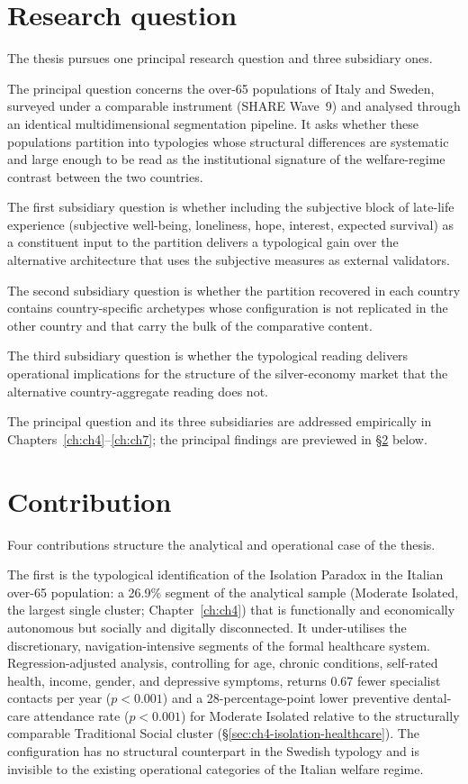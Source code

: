 \section{Research question}
\label{sec:ch1-question}

The thesis pursues one principal research question and three subsidiary ones.

The principal question concerns the over-65 populations of Italy and Sweden, surveyed under a comparable instrument (SHARE Wave~9) and analysed through an identical multidimensional segmentation pipeline. It asks whether these populations partition into typologies whose structural differences are systematic and large enough to be read as the institutional signature of the welfare-regime contrast between the two countries.

The first subsidiary question is whether including the subjective block of late-life experience (subjective well-being, loneliness, hope, interest, expected survival) as a constituent input to the partition delivers a typological gain over the alternative architecture that uses the subjective measures as external validators.

The second subsidiary question is whether the partition recovered in each country contains country-specific archetypes whose configuration is not replicated in the other country and that carry the bulk of the comparative content.

The third subsidiary question is whether the typological reading delivers operational implications for the structure of the silver-economy market that the alternative country-aggregate reading does not.

The principal question and its three subsidiaries are addressed empirically in Chapters~\ref{ch:ch4}--\ref{ch:ch7}; the principal findings are previewed in \S\ref{sec:ch1-contribution} below.

\section{Contribution}
\label{sec:ch1-contribution}

Four contributions structure the analytical and operational case of the thesis.

The first is the typological identification of the Isolation Paradox in the Italian over-65 population: a 26.9\% segment of the analytical sample (Moderate Isolated, the largest single cluster; Chapter~\ref{ch:ch4}) that is functionally and economically autonomous but socially and digitally disconnected. It under-utilises the discretionary, navigation-intensive segments of the formal healthcare system. Regression-adjusted analysis, controlling for age, chronic conditions, self-rated health, income, gender, and depressive symptoms, returns 0.67 fewer specialist contacts per year ($p < 0.001$) and a 28-percentage-point lower preventive dental-care attendance rate ($p < 0.001$) for Moderate Isolated relative to the structurally comparable Traditional Social cluster (\S\ref{sec:ch4-isolation-healthcare}). The configuration has no structural counterpart in the Swedish typology and is invisible to the existing operational categories of the Italian welfare regime.

